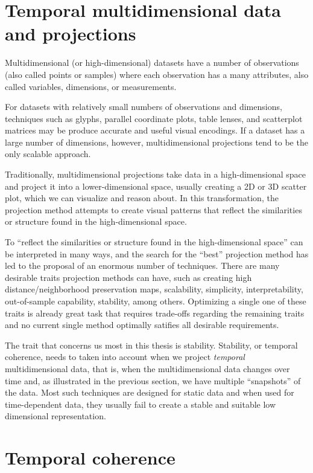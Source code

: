 \section{Temporal multidimensional data and projections}

Multidimensional (or high-dimensional) datasets have a number of observations (also called points or samples) where each observation has a many attributes, also called variables, dimensions, or measurements. 

For datasets with relatively small numbers of observations and dimensions, techniques such as glyphs, parallel coordinate plots, table lenses, and scatterplot matrices may be produce accurate and useful visual encodings.  
If a dataset has a large number of dimensions, however, multidimensional projections tend to be the only scalable approach.  

Traditionally, multidimensional projections take data in a high-dimensional space and project it into a lower-dimensional space, usually creating a 2D or 3D scatter plot, which we can visualize and reason about. In this transformation, the projection method attempts to create visual patterns that reflect the similarities or structure found in the high-dimensional space.

To ``reflect the similarities or structure found in the high-dimensional space'' can be interpreted in many ways, and the search for the ``best'' projection method has led to the proposal of an enormous number of techniques.
There are many desirable traits projection methods can have, such as creating high distance/neighborhood preservation maps, scalability, simplicity, interpretability, out-of-sample capability, stability, among others. 
Optimizing a single one of these traits is already great task that requires trade-offs regarding the remaining traits and no current single method optimally satifies all desirable requirements.

The trait that concerns us most in this thesis is stability. Stability, or temporal coherence, needs to taken into account when we project \emph{temporal} multidimensional data, that is, when the multidimensional data changes over time and, as illustrated in the previous section, we have multiple ``snapshots'' of the data. 
Most such techniques are designed for static data and when used for time-dependent data, they usually fail to create a stable and suitable low dimensional representation.

\section{Temporal coherence}

